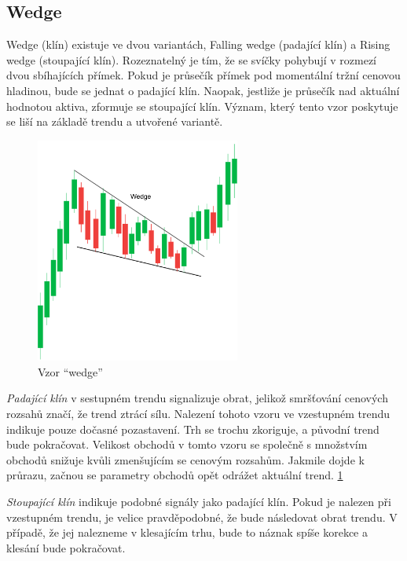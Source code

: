 \subsection{Wedge}
Wedge (klín) existuje ve dvou variantách, Falling wedge (padající klín) a Rising wedge (stoupající klín). Rozeznatelný je tím, že se svíčky pohybují v rozmezí dvou sbíhajících přímek.
Pokud je průsečík přímek pod momentální tržní cenovou hladinou, bude se jednat o padající klín. Naopak, jestliže je průsečík nad aktuální hodnotou aktiva, zformuje se stoupající klín.
Význam, který tento vzor poskytuje se liší na základě trendu a utvořené variantě.
\begin{figure}[ht]
    \centering
    \includegraphics[width=0.6\textwidth]{Figures/wedge.pdf}
    \caption{Vzor \enquote{wedge}}
    \label{fig:wedge}
\end{figure}

\emph{Padající klín} v sestupném trendu signalizuje obrat, jelikož smršťování cenových rozsahů značí, že trend ztrácí sílu. Nalezení tohoto vzoru ve vzestupném trendu indikuje pouze
dočasné pozastavení. Trh se trochu zkoriguje, a původní trend bude pokračovat. Velikost obchodů v tomto vzoru se společně s množstvím obchodů snižuje kvůli zmenšujícím se cenovým
rozsahům. Jakmile dojde k průrazu, začnou se parametry obchodů opět odrážet aktuální trend. \ref{fig:wedge}

\emph{Stoupající klín} indikuje podobné signály jako padající klín. Pokud je nalezen při vzestupném trendu, je velice pravděpodobné, že bude následovat obrat trendu. V případě, že jej
nalezneme v klesajícím trhu, bude to náznak spíše korekce a klesání bude pokračovat.

